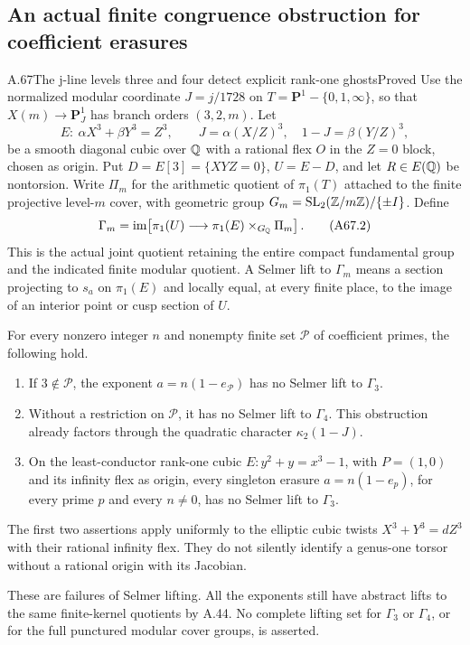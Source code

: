 \subsection{An actual finite congruence obstruction for coefficient erasures}

\begin{statement}{A.67}{The j-line levels three and four detect explicit rank-one ghosts}{Proved}
Use the normalized modular coordinate $J=j/1728$ on
$T=\mathbf P^1-\{0,1,\infty\}$, so that $X(m)\to\mathbf P^1_J$
has branch orders $(3,2,m)$. Let
\[
 E:\ \alpha X^3+\beta Y^3=Z^3,\qquad
 J=\alpha(X/Z)^3,\quad1-J=\beta(Y/Z)^3,
 \tag{A67.1}
\]
be a smooth diagonal cubic over $\mathbb Q$ with a rational flex
$O$ in the $Z=0$ block, chosen as origin. Put
$D=E[3]=\{XYZ=0\}$, $U=E-D$, and let $R\in E(\mathbb Q)$
be nontorsion. Write $\Pi_m$ for the arithmetic quotient
of $\pi_1(T)$ attached to the finite projective level-$m$
cover, with geometric group
$G_m=\mathrm{SL}_2(\mathbb Z/m\mathbb Z)/\{\pm I\}$. Define
\[
 \Gamma_m=
 \operatorname{im}\!\left[
  \pi_1(U)\longrightarrow
  \pi_1(E)\times_{G_\mathbb Q}\Pi_m\right].
 \tag{A67.2}
\]
This is the actual joint quotient retaining the entire
compact fundamental group and the indicated finite
modular quotient. A Selmer lift to $\Gamma_m$ means
a section projecting to $s_a$ on $\pi_1(E)$ and locally
equal, at every finite place, to the image of an
interior point or cusp section of $U$.

For every nonzero integer $n$ and nonempty finite set
$\mathcal P$ of coefficient primes, the following
hold.
\begin{enumerate}
\item If $3\notin\mathcal P$, the exponent
      $a=n(1-e_{\mathcal P})$ has no Selmer lift
      to $\Gamma_3$.
\item Without a restriction on $\mathcal P$,
      it has no Selmer lift to $\Gamma_4$.
      This obstruction already factors through
      the quadratic character $\kappa_2(1-J)$.
\item On the least-conductor rank-one cubic
      $E:y^2+y=x^3-1$, with $P=(1,0)$ and its
      infinity flex as origin, every singleton
      erasure $a=n(1-e_p)$, for every prime $p$
      and every $n\ne0$, has no Selmer lift to
      $\Gamma_3$.
\end{enumerate}
The first two assertions apply uniformly to
the elliptic cubic twists $X^3+Y^3=dZ^3$
with their rational infinity flex.
They do not silently identify a genus-one
torsor without a rational origin with its
Jacobian.

These are failures of Selmer lifting. All
the exponents still have abstract lifts
to the same finite-kernel quotients by A.44.
No complete lifting set for $\Gamma_3$ or
$\Gamma_4$, or for the full punctured modular
cover groups, is asserted.
\end{statement}
